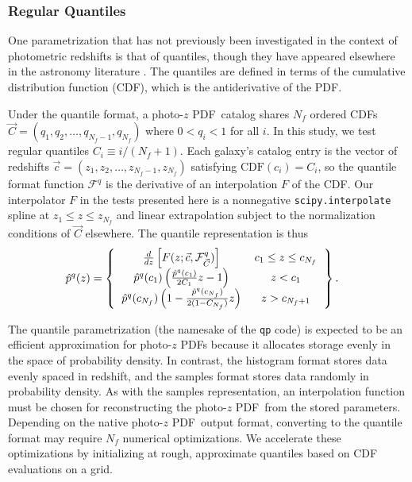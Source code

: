 \documentclass[\docopts]{\docclass}
\newcommand{\pz}{photo-$z$ PDF}
\begin{document}
\subsubsection{Regular Quantiles}
\label{sec:quantiles}

One parametrization that has not previously been investigated in the context of 
photometric redshifts is that of quantiles, though they have appeared elsewhere 
in the astronomy literature \citep{sun_star_2015, pizzocaro_results_2016, 
laycock_x-ray_2017}.
The quantiles are defined in terms of the cumulative distribution function 
(CDF), which is the antiderivative of the PDF.

Under the quantile format, a \pz\ catalog shares $N_{f}$ ordered CDFs $\vec{C} 
= (q_{1}, q_{2}, \dots, q_{N_{f}-1}, q_{N_{f}})$ where $0 < q_{i} < 1$ for all 
$i$.
In this study, we test regular quantiles $C_{i} \equiv i / (N_{f} + 1)$.
Each galaxy's catalog entry is the vector of redshifts $\vec{c} = (z_{1}, 
z_{2}, \dots, z_{N_{f}-1}, z_{N_{f}})$ satisfying $\mathrm{CDF}(c_{i}) = 
C_{i}$, so the quantile format function $\mathcal{F}^{q}$ is the derivative of 
an interpolation $F$ of the CDF.
Our interpolator $F$ in the tests presented here is a nonnegative 
\texttt{scipy.interpolate} spline at $z_{1} \leq z \leq z_{N_{f}}$ and linear 
extrapolation subject to the normalization conditions of $\vec{C}$ elsewhere.
The quantile representation is thus
\begin{align}
  \label{eq:quantiles}
  \hat{p}^{q}(z) &=
  \left\{
  \begin{tabular}{cc}
  $\frac{d}{dz} \left[F(z; \vec{c}, \mathcal{F}^{q}_{\vec{C}})\right]$ & $c_{1} 
\leq z \leq c_{N_{f}}$ \\
  $\hat{p}^{q}(c_{1})\left(\frac{\hat{p}^{q}(c_{1})}{2C_{1}} z - 1\right)$ & $z 
< c_{1}$ \\
  $\hat{p}^{q}(c_{N_{f}})\left(1 - \frac{\hat{p}^{q}(c_{N_{f}})}{2(1 - 
C_{N_{f}})} z\right)$ & $z > c_{N_{f}+1}$
  \end{tabular}
  \right\}.
\end{align}


The quantile parametrization (the namesake of the \texttt{qp} code) is expected 
to be an efficient approximation for \pz s because it allocates storage evenly 
in the space of probability density.
In contrast, the histogram format stores data evenly spaced in redshift, and 
the samples format stores data randomly in probability density.
As with the samples representation, an interpolation function must be chosen 
for reconstructing the \pz\ from the stored parameters.
Depending on the native \pz\ output format, converting to the quantile format 
may require $N_{f}$ numerical optimizations.
We accelerate these optimizations by initializing at rough, approximate 
quantiles based on CDF evaluations on a grid.
\end{document}

